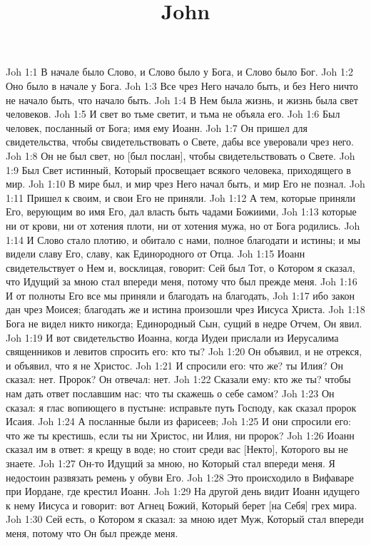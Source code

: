 

\title{John}

Joh 1:1  В начале было Слово, и Слово было у Бога, и Слово было Бог.
Joh 1:2  Оно было в начале у Бога.
Joh 1:3  Все чрез Него начало быть, и без Него ничто не начало быть, что начало быть.
Joh 1:4  В Нем была жизнь, и жизнь была свет человеков.
Joh 1:5  И свет во тьме светит, и тьма не объяла его.
Joh 1:6  Был человек, посланный от Бога; имя ему Иоанн.
Joh 1:7  Он пришел для свидетельства, чтобы свидетельствовать о Свете, дабы все уверовали чрез него.
Joh 1:8  Он не был свет, но [был послан], чтобы свидетельствовать о Свете.
Joh 1:9  Был Свет истинный, Который просвещает всякого человека, приходящего в мир.
Joh 1:10  В мире был, и мир чрез Него начал быть, и мир Его не познал.
Joh 1:11  Пришел к своим, и свои Его не приняли.
Joh 1:12  А тем, которые приняли Его, верующим во имя Его, дал власть быть чадами Божиими,
Joh 1:13  которые ни от крови, ни от хотения плоти, ни от хотения мужа, но от Бога родились.
Joh 1:14  И Слово стало плотию, и обитало с нами, полное благодати и истины; и мы видели славу Его, славу, как Единородного от Отца.
Joh 1:15  Иоанн свидетельствует о Нем и, восклицая, говорит: Сей был Тот, о Котором я сказал, что Идущий за мною стал впереди меня, потому что был прежде меня.
Joh 1:16  И от полноты Его все мы приняли и благодать на благодать,
Joh 1:17  ибо закон дан чрез Моисея; благодать же и истина произошли чрез Иисуса Христа.
Joh 1:18  Бога не видел никто никогда; Единородный Сын, сущий в недре Отчем, Он явил.
Joh 1:19  И вот свидетельство Иоанна, когда Иудеи прислали из Иерусалима священников и левитов спросить его: кто ты?
Joh 1:20  Он объявил, и не отрекся, и объявил, что я не Христос.
Joh 1:21  И спросили его: что же? ты Илия? Он сказал: нет. Пророк? Он отвечал: нет.
Joh 1:22  Сказали ему: кто же ты? чтобы нам дать ответ пославшим нас: что ты скажешь о себе самом?
Joh 1:23  Он сказал: я глас вопиющего в пустыне: исправьте путь Господу, как сказал пророк Исаия.
Joh 1:24  А посланные были из фарисеев;
Joh 1:25  И они спросили его: что же ты крестишь, если ты ни Христос, ни Илия, ни пророк?
Joh 1:26  Иоанн сказал им в ответ: я крещу в воде; но стоит среди вас [Некто], Которого вы не знаете.
Joh 1:27  Он-то Идущий за мною, но Который стал впереди меня. Я недостоин развязать ремень у обуви Его.
Joh 1:28  Это происходило в Вифаваре при Иордане, где крестил Иоанн.
Joh 1:29  На другой день видит Иоанн идущего к нему Иисуса и говорит: вот Агнец Божий, Который берет [на Себя] грех мира.
Joh 1:30  Сей есть, о Котором я сказал: за мною идет Муж, Который стал впереди меня, потому что Он был прежде меня.
